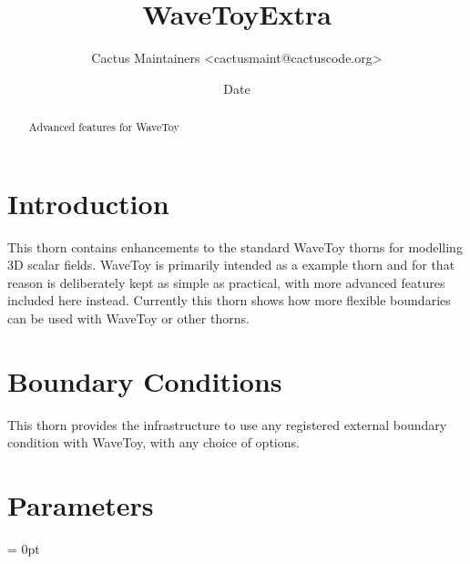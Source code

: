 \documentclass{article}
\begin{document}
\author{Cactus Maintainers \textless cactusmaint@cactuscode.org\textgreater}

\title{WaveToyExtra}

\date{$ $Date$ $}

\maketitle



\begin{abstract}
Advanced features for WaveToy
\end{abstract}


\section{Introduction}

This thorn contains enhancements to the standard WaveToy thorns for 
modelling 3D scalar fields. WaveToy is primarily intended as a 
example thorn and for that reason is deliberately kept as simple
as practical, with more advanced features included here instead. 
Currently this thorn shows how more flexible boundaries can be 
used with WaveToy or other thorns.

\section{Boundary Conditions}

This thorn provides the infrastructure to use any registered 
external boundary condition with WaveToy, with any choice of options. 




\section{Parameters} 


\parskip = 0pt
\end{document}
